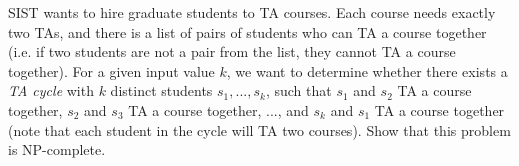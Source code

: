 \problem{}
SIST wants to hire graduate students to TA courses.  Each course needs exactly two TAs, and there is a list of pairs of students who can TA a course together (i.e. if two students are not a pair from the list, they cannot TA a course together).  For a given input value $k$, we want to determine whether there exists a \emph{TA cycle} with $k$ distinct students $s_1, ..., s_k$, such that $s_1$ and $s_2$ TA a course together, $s_2$ and $s_3$ TA a course together, ..., and $s_k$ and $s_1$ TA a course together (note that each student in the cycle will TA two courses).  Show that this problem is NP-complete.

\solution{}
\newpage